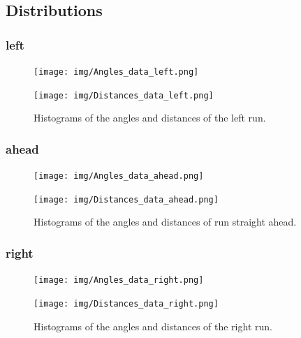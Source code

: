 \documentclass{scrartcl}
\begin{document}
\subsection{Distributions}

\subsubsection{left}
\begin{figure}[H]
\centering
\begin{minipage}{.5\textwidth}
  \centering
  \texttt{[image: img/Angles\_data\_left.png]}
\end{minipage}%
\begin{minipage}{.5\textwidth}
  \centering
  \texttt{[image: img/Distances\_data\_left.png]}
\end{minipage}
\caption{Histograms of the angles and distances of the left run.}
\end{figure}


\subsubsection{ahead}
\begin{figure}[H]
\centering
\begin{minipage}{.5\textwidth}
  \centering
  \texttt{[image: img/Angles\_data\_ahead.png]}
\end{minipage}%
\begin{minipage}{.5\textwidth}
  \centering
  \texttt{[image: img/Distances\_data\_ahead.png]}
\end{minipage}
\caption{Histograms of the angles and distances of run straight ahead.}
\end{figure}


\subsubsection{right}

\begin{figure}[H]
\centering
\begin{minipage}{.5\textwidth}
  \centering
  \texttt{[image: img/Angles\_data\_right.png]}
\end{minipage}%
\begin{minipage}{.5\textwidth}
  \centering
  \texttt{[image: img/Distances\_data\_right.png]}
\end{minipage}
\caption{Histograms of the angles and distances of the right run.}
\end{figure}
\end{document}
